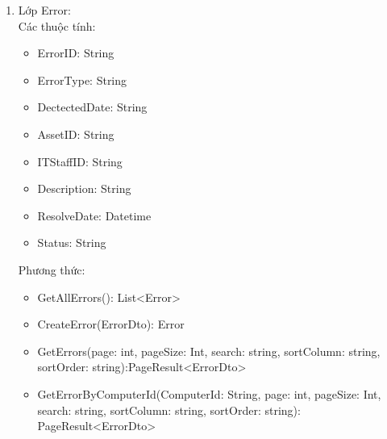 \begin{enumerate}
\begin{itemize}[label=--]
    \end{itemize}
    Phương thức:
    \begin{itemize}[label=--]
        \item GetAllMaintenance(): List<Maintenance>
        \item CreateMaintenance(MaintenanceDto): Maintenance 
        \item GetMaintenances(page: int, pageSize: Int, search: string, sortColumn: string, sortOrder: string): PageResult<MaintenanceDto>
        \item GetMaintenanceByComputerId(ComputerId: String, page: int, pageSize: Int, search: string, sortColumn: string, sortOrder: string): PageResult<Maintenance>
    \end{itemize}
    Mối quan hệ tham gia:
    \begin{itemize}[label=--]
        \item Compostion với lớp ITstaff
        \item Association với lớp Asset
    \end{itemize}
    \item Lớp Error:\\
    Các thuộc tính:
    \begin{itemize}[label=--]
        \item ErrorID: String
        \item ErrorType: String
        \item DectectedDate: String
        \item AssetID: String
        \item ITStaffID: String
        \item Description: String
        \item ResolveDate: Datetime
        \item Status: String
    \end{itemize}
    Phương thức:
    \begin{itemize}[label=--]
        \item GetAllErrors(): List<Error>
        \item CreateError(ErrorDto): Error 
        \item GetErrors(page: int, pageSize: Int, search: string, sortColumn: string, sortOrder: string):PageResult<ErrorDto>
        \item GetErrorByComputerId(ComputerId: String, page: int, pageSize: Int, search: string, sortColumn: string, sortOrder: string): PageResult<ErrorDto>
    \end{itemize}

\end{enumerate}
